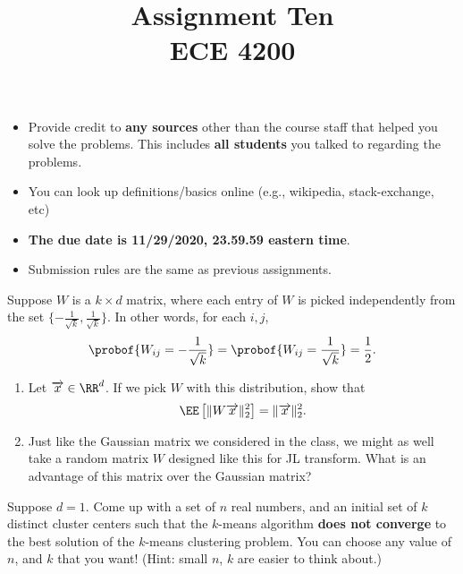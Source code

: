 \documentclass[11pt]{article}
\title{Assignment Ten\\ ECE 4200}
\date{}
\newenvironment{problem}[2][Problem]{\begin{trivlist}
\item[\hskip \labelsep {\bfseries #1}\hskip \labelsep {\bfseries #2.}]}{\end{trivlist}}
\begin{document}
\maketitle 

\begin{itemize}
\item
Provide credit to \textbf{any sources} other than the course staff that helped you solve the problems. This includes \textbf{all students} you talked to regarding the problems. 	
\item
You can look up definitions/basics online (e.g., wikipedia, stack-exchange, etc)
\item
{\bf The due date is 11/29/2020, 23.59.59 eastern time}. 
\item
Submission rules are the same as previous assignments.
\end{itemize}



\begin{problem}{1. (10 points)}
Suppose $W$ is a $k\times d$ matrix, where each entry of $W$ is picked independently from the set $\{-\frac1{\sqrt k},\frac1{\sqrt k}\}$. In other words, for each $i, j$, 
\[
\probof{W_{ij}=-\frac1{\sqrt k}}=\probof{W_{ij}=\frac1{\sqrt k}}=\frac12.
\]

\begin{enumerate}
\item 
Let $\overrightarrow x\in \RR^d$. If we pick $W$ with this distribution, show that
\[
\EE\left[\lVert W\overrightarrow x \rVert_2^2\right] = \lVert \overrightarrow x \rVert_2^2.
\]
\item
Just like the Gaussian matrix we considered in the class, we might as well take a random matrix $W$ designed like this for JL transform. What is an advantage of this matrix over the Gaussian matrix? 
\end{enumerate}
\end{problem}


\begin{problem}{2. (10 points)}
Suppose $d=1$. Come up with a set of $n$ real numbers, and an initial set of $k$ distinct cluster centers such that the $k$-means algorithm \textbf{does not converge} to the best solution of the $k$-means clustering problem. You can choose any value of $n$, and $k$ that you want! (Hint: small $n$, $k$ are easier to think about.)
\end{problem}
\end{document}
